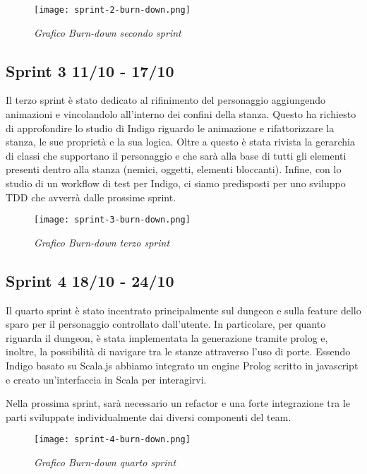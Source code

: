 \begin{figure}[H]
    \centering
    \texttt{[image: sprint-2-burn-down.png]}
    \caption{\textit{Grafico Burn-down secondo sprint}} 
\end{figure}

\newpage
\subsection{Sprint 3 11/10 - 17/10}

Il terzo sprint è stato dedicato al rifinimento del personaggio aggiungendo animazioni e vincolandolo all'interno dei confini della stanza. 
Questo ha richiesto di approfondire lo studio di Indigo riguardo le animazione e rifattorizzare la stanza, le sue proprietà e la sua logica. 
Oltre a questo è stata rivista la gerarchia di classi che supportano il personaggio e che sarà alla base di tutti gli elementi presenti dentro alla stanza (nemici, oggetti, elementi bloccanti).
Infine, con lo studio di un workflow di test per Indigo, ci siamo predisposti per uno sviluppo TDD che avverrà dalle prossime sprint.

\begin{figure}[H]
    \centering
    \texttt{[image: sprint-3-burn-down.png]}
    \caption{\textit{Grafico Burn-down terzo sprint}} 
\end{figure}

\newpage
\subsection{Sprint 4 18/10 - 24/10}
Il quarto sprint è stato incentrato principalmente sul dungeon e sulla feature dello sparo per il personaggio controllato dall'utente. 
In particolare, per quanto riguarda il dungeon, è stata implementata la generazione tramite prolog e, inoltre, la possibilità di navigare tra le stanze attraverso l'uso di porte. 
Essendo Indigo basato su Scala.js abbiamo integrato un engine Prolog scritto in javascript e creato un'interfaccia in Scala per interagirvi.

Nella prossima sprint, sarà necessario un refactor e una forte integrazione tra le parti sviluppate individualmente dai diversi componenti del team.

\begin{figure}[H]
    \centering
    \texttt{[image: sprint-4-burn-down.png]}
    \caption{\textit{Grafico Burn-down quarto sprint}} 
\end{figure}

